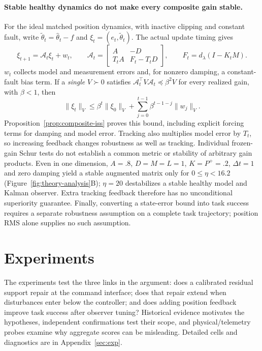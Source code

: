\documentclass{article}
\begin{document}
\paragraph{Stable healthy dynamics do not make every composite gain stable.}
For the ideal matched position dynamics, with inactive clipping and constant fault, write
$\tilde\theta_t=\hat\theta_t-f$ and $\xi_t=(e_t,\tilde\theta_t)$. The actual update timing gives
\begin{equation}\label{eq:main-augmented}
 \xi_{t+1}=\mathcal A_t\xi_t+w_t,\qquad
 \mathcal A_t=\begin{bmatrix}A&-D\\T_tA&F_t-T_tD\end{bmatrix},
 \qquad F_t=d_\lambda(I-K_tM).
\end{equation}
$w_t$ collects model and measurement errors and, for nonzero damping, a constant-fault bias
term. If a \emph{single} $V\succ0$ satisfies
$\mathcal A_t^\top V\mathcal A_t\preceq\beta^2V$ for every realized gain, with $\beta<1$, then
\begin{equation}\label{eq:main-iss}
 \|\xi_t\|_V\le\beta^t\|\xi_0\|_V+
 \sum_{j=0}^{t-1}\beta^{t-1-j}\|w_j\|_V.
\end{equation}
Proposition~\ref{prop:composite-iss} proves this bound, including explicit forcing terms
for damping and model error. Tracking also multiplies model error by $T_t$, so increasing
feedback changes robustness as well as tracking. Individual frozen-gain
Schur tests do not establish a common metric or stability of arbitrary gain products.
Even in one dimension, $A=.8$, $D=M=L=1$, $K=P^+=.2$, $\Delta t=1$ and zero damping yield
a stable augmented matrix only for $0\le\eta<16.2$ (Figure~\ref{fig:theory-analysis}B);
$\eta=20$ destabilizes a stable healthy
model and Kalman observer. Extra tracking feedback therefore has no unconditional
superiority guarantee. Finally, converting a state-error bound into task success requires
a separate robustness assumption on a complete task trajectory; position RMS alone supplies
no such assumption.

\section{Experiments}
\label{sec:evaluation}
The experiments test the three links in the argument: does a calibrated residual support
repair at the command interface; does that repair extend when disturbances enter below the
controller; and does adding position feedback improve task success after observer tuning?
Historical evidence motivates the hypotheses, independent confirmations test their scope,
and physical/telemetry probes examine why aggregate scores can be misleading.
Detailed cells and diagnostics are in Appendix~\ref{sec:exp}.
\end{document}
